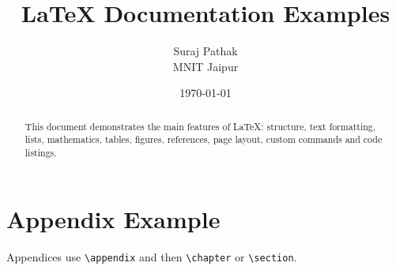 \documentclass[12pt,a4paper]{report}
\title{\LaTeX{} Documentation Examples}
\author{Suraj Pathak\\MNIT Jaipur}
\date{\today}
\begin{document}
\maketitle
\begin{abstract}
This document demonstrates the main features of \LaTeX{}: structure,
text formatting, lists, mathematics, tables, figures, references,
page layout, custom commands and code listings.
\end{abstract}
\tableofcontents









\appendix
\chapter{Appendix Example}
Appendices use \verb|\appendix| and then \verb|\chapter| or \verb|\section|.
\end{document}
